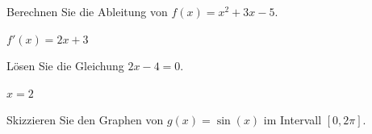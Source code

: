\documentclass[12pt,a4paper]{exam}
\begin{document}
\begin{center}
\end{center}

\vspace{1em}

\begin{questions}

\question[10]
Berechnen Sie die Ableitung von $f(x) = x^2 + 3x - 5$.
\begin{solution}
    $f'(x) = 2x + 3$
\end{solution}

\question[5]
Lösen Sie die Gleichung $2x - 4 = 0$.
\begin{solution}
    $x = 2$
\end{solution}

\question[15]
Skizzieren Sie den Graphen von $g(x) = \sin(x)$ im Intervall $[0, 2\pi]$.
\vspace{4cm}

\end{questions}
\end{document}
